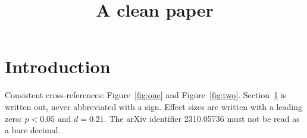 \documentclass{acmart}
\begin{document}
\title{A clean paper}
\section{Introduction}
\label{sec:intro}
Consistent cross-references: Figure~\ref{fig:one} and Figure~\ref{fig:two}.
Section~\ref{sec:intro} is written out, never abbreviated with a sign.
Effect sizes are written with a leading zero: $p < 0.05$ and $d = 0.21$.
The arXiv identifier 2310.05736 must not be read as a bare decimal.
\end{document}
